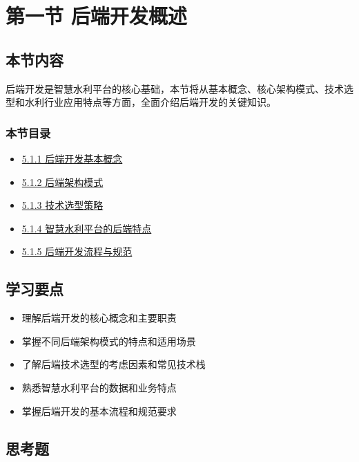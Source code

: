 \section{第一节
后端开发概述}\label{ux7b2cux4e00ux8282-ux540eux7aefux5f00ux53d1ux6982ux8ff0}

\subsection{本节内容}\label{ux672cux8282ux5185ux5bb9}

后端开发是智慧水利平台的核心基础，本节将从基本概念、核心架构模式、技术选型和水利行业应用特点等方面，全面介绍后端开发的关键知识。

\subsubsection{本节目录}\label{ux672cux8282ux76eeux5f55}

\begin{itemize}
\tightlist
\item
  \href{section05-01/section05-01-01.md}{5.1.1 后端开发基本概念}
\item
  \href{section05-01/section05-01-02.md}{5.1.2 后端架构模式}
\item
  \href{section05-01/section05-01-03.md}{5.1.3 技术选型策略}
\item
  \href{section05-01/section05-01-04.md}{5.1.4 智慧水利平台的后端特点}
\item
  \href{section05-01/section05-01-05.md}{5.1.5 后端开发流程与规范}
\end{itemize}

\subsection{学习要点}\label{ux5b66ux4e60ux8981ux70b9}

\begin{itemize}
\tightlist
\item
  理解后端开发的核心概念和主要职责
\item
  掌握不同后端架构模式的特点和适用场景
\item
  了解后端技术选型的考虑因素和常见技术栈
\item
  熟悉智慧水利平台的数据和业务特点
\item
  掌握后端开发的基本流程和规范要求
\end{itemize}

\subsection{思考题}\label{ux601dux8003ux9898}


